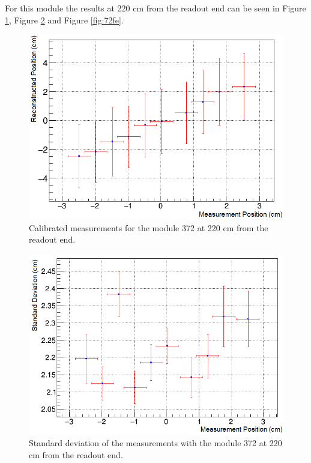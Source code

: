 \documentclass[a4paper]{article}\linespread{1.4}
\begin{document}
For this module the results at 220 cm from the readout end can be seen in Figure \ref{fig:72fm}, Figure \ref{fig:72fs} and Figure \ref{fig:72fe}. 
\begin{figure}[h!] \hspace*{-0cm} \includegraphics[width=120mm,scale=2.0]{figures/72fm.png} \caption{Calibrated measurements for the module 372 at 220 cm from the readout end.}  \label{fig:72fm}\end{figure}
\begin{figure}[h!] \hspace*{-0cm} \includegraphics[width=120mm,scale=2.0]{figures/72fs.png} \caption{Standard deviation of the measurements with the module 372 at 220 cm from the readout end.}  \label{fig:72fs}\end{figure}
\end{document}
